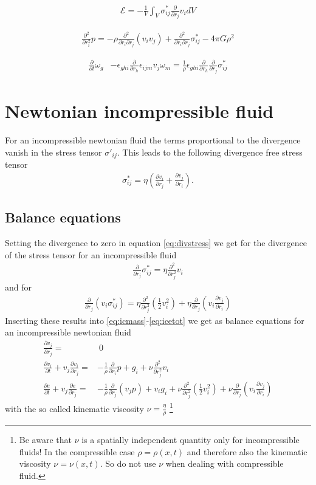 \documentclass[a4paper,
					fontsize=12pt,
					twoside,
					pagesize,
					cleardoublepage=plain,
					headsepline,
					bibliography=totoc
					]{scrbook}
\newcommand{\lra}[1]{{ \left( #1 \right) }}
\newcommand{\pd}[1]{\frac{\partial}{\partial #1}}
\newcommand{\ppd}[2]{\frac{\partial #2}{\partial #1}}
\newcommand{\pdd}[1]{\frac{\partial^2}{\partial #1^2}}
\begin{document}
\begin{align}
\mathcal{E} = 
-\frac{1}{V} \int_V \sigma^*_{ij}\pd{r_j} v_i dV
\label{eq:icdiss}
\end{align}

\begin{align}
\pdd{r_i}p= 
-\rho \frac{\partial^2}{\partial r_i \partial r_j}(v_i v_j)
+\frac{\partial^2}{\partial r_i \partial r_j}\sigma^*_{ij} 
-4\pi G \rho^2
\label{eq:icdiv}
\end{align}

\begin{align}
\pd{t}\omega_g
&-\epsilon_{ghi}\pd{r_h} \epsilon_{ijm} v_j \omega_m =
\frac{1}{\rho}\epsilon_{ghi}\pd{r_h}\pd{r_j}\sigma^*_{ij}
\label{eq:icvort}
\end{align}


\chapter{Newtonian incompressible fluid}
For an incompressible newtonian fluid the terms proportional to the divergence
vanish in the stress tensor $\sigma'_{ij}$. This leads to the following
divergence free stress tensor
\begin{align}
\sigma^*_{ij}=\eta \lra{\ppd{r_j}{v_i}+\ppd{r_i}{v_j}}. 
\label{eq:nicstress}
\end{align}

\section{Balance equations}
Setting the divergence to zero in equation \ref{eq:divstress} we get for
the divergence of the stress tensor for an incompressible fluid
\begin{align}
\pd{r_j} \sigma^*_{ij} =\eta \pdd{r_j}v_i \label{eq:nicdivstress}
\end{align}
and for
\begin{align}
\pd{r_j}(v_i \sigma^*_{ij})
=\eta \pdd{r_j}\lra{\frac{1}{2}v_i^2}+\eta\pd{r_j}\lra{v_i\ppd{r_i}{v_j}}
\end{align}
Inserting these results into \eqref{eq:icmass}-\eqref{eq:icetot} we get
as balance equations for an incompressible newtonian fluid
\begin{align}
\ppd{r_j}{v_j} =&\ 0\\
\ppd{t}{v_i} + v_j \ppd{r_j}{v_i} =& -\frac{1}{\rho}\pd{r_i}p + g_i
+\nu\pdd{r_j}v_i\\
\ppd{t}{e} + v_j \ppd{r_j}{e} =& -\frac{1}{\rho} \pd{r_j}(v_j p) + v_i g_i
+\nu \pdd{r_j}\lra{\frac{1}{2}v_i^2}+ \nu \pd{r_j}\lra{v_i\ppd{r_i}{v_j}}
\end{align}
with the so called kinematic viscosity $\nu=\frac{\eta}{\rho}$
\footnote{Be aware that $\nu$ is a spatially independent quantity only 
for incompressible fluids! In the compressible case $\rho=\rho(x,t)$ and
therefore also the kinematic viscosity $\nu=\nu(x,t)$. So do not use $\nu$
when dealing with compressible fluid.}
\end{document}
